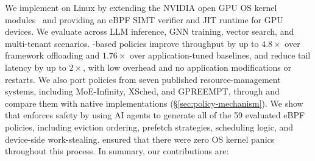 

We implement \sys{} on Linux by extending the NVIDIA open GPU OS kernel modules~\cite{nvidia-open-gpu} and providing an eBPF SIMT verifier and JIT runtime for GPU devices.
We evaluate \sys{} across LLM inference, GNN training, vector search, and multi-tenant scenarios.
\sys-based policies improve throughput by up to $4.8\times$ over framework offloading and $1.76\times$ over application-tuned baselines, and reduce tail latency by up to $2\times$, with low overhead and no application modifications or restarts.
We also port policies from seven published resource-management systems, including MoE-Infinity, XSched, and GPREEMPT, through \sys{} and compare them with native implementations (\S\ref{sec:policy-mechanism}).
We show that \sys{} enforces safety by using AI agents to generate all of the 59 evaluated eBPF policies, including eviction ordering, prefetch strategies, scheduling logic, and device-side work-stealing.
\sys{} ensured that there were zero OS kernel panics throughout this process.
In summary, our contributions are:

